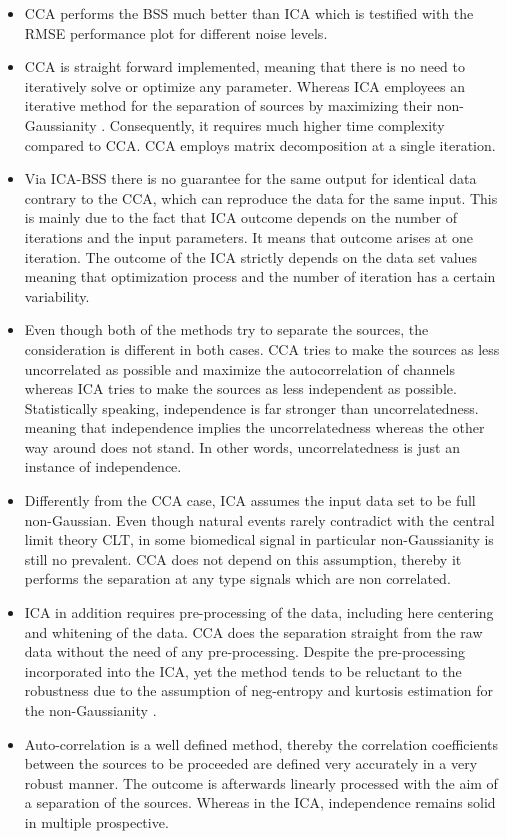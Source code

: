 \begin{itemize}

\item CCA performs the BSS much better than ICA which is testified with the RMSE performance plot for different noise levels.

\item CCA is straight forward implemented, meaning that there is no need to iteratively solve or optimize any parameter. Whereas ICA employees an iterative method for the separation of sources by maximizing their non-Gaussianity \cite{15}. Consequently, it requires much higher time complexity compared to CCA. CCA employs matrix decomposition at a single iteration.  

\item Via ICA-BSS there is no guarantee for the same output for identical data contrary to the CCA, which can reproduce the data for the same input. This is mainly due to the fact that ICA outcome depends on the number of iterations and the input parameters\cite{16}. It means that outcome arises at one iteration. The outcome of the ICA strictly depends on the data set values meaning that optimization process and the number of iteration has a certain variability. 

\item Even though both of the methods try to separate the sources, the consideration is different in both cases. CCA tries to make the sources as less uncorrelated as possible and maximize the autocorrelation of channels whereas ICA tries to make the sources as less independent as possible. Statistically speaking, independence is far stronger than uncorrelatedness. meaning that independence implies the uncorrelatedness whereas the other way around does not stand. In other words, uncorrelatedness is just an instance of independence\cite{15}. 

\item Differently from the CCA case, ICA assumes the input data set to be full non-Gaussian\cite{15}. Even though natural events rarely contradict with the central limit theory CLT, in some biomedical signal in particular non-Gaussianity is still no prevalent. CCA does not depend on this assumption, thereby it performs the separation at any type signals which are non correlated.

\item ICA in addition requires pre-processing  of the data, including here centering and whitening of the data\cite{15}. CCA does the separation straight from the raw data without the need of any pre-processing. Despite the pre-processing incorporated into the ICA, yet the method tends to be reluctant to the robustness due to the assumption of neg-entropy and kurtosis estimation for the non-Gaussianity \cite{17}. 

\item Auto-correlation is a well defined method, thereby the correlation coefficients between the sources to be proceeded are defined very accurately in a very robust manner. The outcome is afterwards linearly processed with the aim of a separation of the sources. Whereas in the ICA, independence remains solid in multiple prospective.  

\end{itemize}